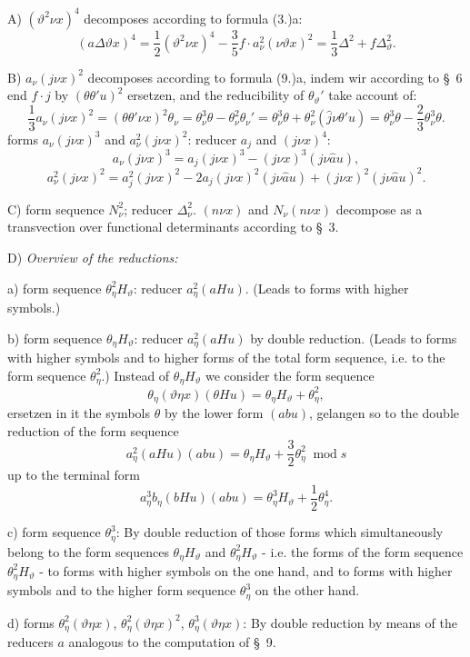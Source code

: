 \documentclass[11pt]{article}
\newcommand{\A}{\Delta}
\newcommand{\modu}[1]{\;\operatorname{mod} #1}
\begin{document}
\noindent A) $(\vartheta^2\nu x)^4$ decomposes according to formula (3.)a:
\[
(a\A\vartheta x)^4=\frac12(\vartheta^2\nu x)^4-\frac35 f\cdot a_\nu^2(\nu\vartheta x)^2
=\frac13\A^2+f\A_\vartheta^2.
\]

\noindent B) $a_\nu(j\nu x)^2$ decomposes according to formula (9.)a, indem wir according to \S\ 6 end $f\cdot j$ by $(\theta\theta'u)^2$ ersetzen, and the reducibility of $\theta_\vartheta'$ take account of:
\[
\frac13a_\nu(j\nu x)^2=(\theta\theta'\nu x)^2\theta_\nu
=\theta_\nu^3\theta-\theta_\nu^2\theta_\nu'
=\theta_\nu^3\theta+\theta_\nu^2(\widehat{j}\nu\theta'u)
=\theta_\nu^3\theta-\frac23\theta_\nu^3\theta.
\]
forms $a_\nu(j\nu x)^3$ and $a_\nu^2(j\nu x)^2$: reducer $a_j$ and $(j\nu x)^4$:
\[
a_\nu(j\nu x)^3=a_j(j\nu x)^3-(j\nu x)^3(j\nu\widehat{a}u),
\]
\[
a_\nu^2(j\nu x)^2=a_j^2(j\nu x)^2-2a_j(j\nu x)^2(j\nu\widehat{a}u)+(j\nu x)^2(j\nu\widehat{a}u)^2.
\]

\noindent C) form sequence $N_\nu^2$; reducer $\A_\nu^2$. $(n\nu x)$ and $N_\nu(n\nu x)$ decompose as a transvection over functional determinants according to \S\ 3.

\noindent D) \emph{Overview of the reductions:}

a) form sequence $\theta_\eta^2H_\vartheta$: reducer $a_\eta^2(aHu)$. (Leads to forms with higher symbols.)

b) form sequence $\theta_\eta H_\vartheta$: reducer $a_\eta^2(aHu)$ by double reduction. (Leads to forms with higher symbols and to higher forms of the total form sequence, i.e. to the form sequence $\theta_\eta^2$.) Instead of $\theta_\eta H_\vartheta$ we consider the form sequence
\[
\theta_\eta(\vartheta\eta x)(\theta Hu)=\theta_\eta H_\vartheta+\theta_\eta^2,
\]
ersetzen in it the symbols $\theta$ by the lower form $(abu)$, gelangen so to the double reduction of the form sequence
\[
a_\eta^2(aHu)(abu)=\theta_\eta H_\vartheta+\frac32\theta_\eta^2\modu{s}
\]
up to the terminal form
\[
a_\eta^3b_\eta(bHu)(abu)=\theta_\eta^3H_\vartheta+\frac12\theta_\eta^4.
\]

c) form sequence $\theta_\eta^3$: By double reduction of those forms which simultaneously belong to the form sequences $\theta_\eta H_\vartheta$ and $\theta_\eta^2H_\vartheta$ - i.e. the forms of the form sequence $\theta_\eta^2H_\vartheta$ - to forms with higher symbols on the one hand, and to forms with higher symbols and to the higher form sequence $\theta_\eta^3$ on the other hand.

d) forms $\theta_\eta^2(\vartheta\eta x)$, $\theta_\eta^2(\vartheta\eta x)^2$, $\theta_\eta^3(\vartheta\eta x)$: By double reduction by means of the reducers $a$ analogous to the computation of \S\ 9.
\end{document}
